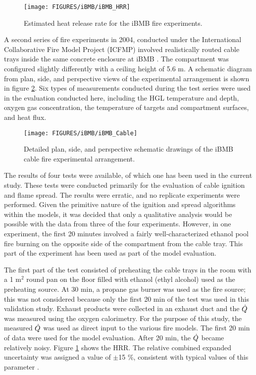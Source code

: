  \begin{figure}
\begin{center}
\texttt{[image: FIGURES/iBMB/iBMB\_HRR]}\\
\end{center}
\caption{Estimated heat release rate for the iBMB fire experiments.}
 \label{fig:iBMB_HRR}
\end{figure}

A second series of fire experiments in 2004, conducted under the International Collaborative Fire Model Project (ICFMP) involved realistically routed cable
trays inside the same concrete enclosure at iBMB \cite{Riese:2004}. The compartment was configured slightly differently with a ceiling height of 5.6 m. A schematic diagram from plan, side, and perspective views of the experimental arrangement is shown in figure \ref{fig:iBMB_Cable_Detailed}. Six types of measurements conducted during the test series were used in the evaluation conducted here, including the HGL temperature and depth, oxygen gas concentration, the temperature of targets and compartment surfaces, and heat flux.

\begin{figure}
\begin{center}
\texttt{[image: FIGURES/iBMB/iBMB\_Cable]}\\
\end{center}
\caption{Detailed plan, side, and perspective schematic drawings of the iBMB cable fire experimental arrangement.}
 \label{fig:iBMB_Cable_Detailed}
\end{figure}

The results of four tests were
available, of which one has been used in the current study.
These tests were conducted primarily for the evaluation of cable ignition and flame spread.
The results were erratic, and no replicate experiments were performed. Given the primitive
nature of the ignition and spread algorithms within the models, it was decided that only
a qualitative analysis would be possible with the data from three of the four experiments.
However, in one experiment, the first 20 minutes involved a fairly well-characterized ethanol
pool fire burning on the opposite side of the compartment from the cable tray. This part of
the experiment has been used as part of the model evaluation.

The first part of the test consisted of preheating the cable trays in the room with a 1 m$^2$ round pan on the floor filled with ethanol (ethyl alcohol) used as the preheating source.  At 30 min, a propane gas burner was used as the fire source; this was not considered because only the first 20 min of the test was used in this validation study.
Exhaust products were collected in an exhaust duct and the $\dot{Q}$  was measured using the oxygen calorimetry.  For the purpose of this study, the measured $\dot{Q}$ was used as direct input to the various fire models.  The first 20 min of data were used for the model evaluation. After 20 min, the  $\dot{Q}$ became relatively noisy.  Figure \ref{fig:iBMB_HRR} shows the HRR. The relative combined expanded uncertainty was assigned a value of $\pm$15 \%, consistent with typical values of this parameter \cite{NRCNUREG1824}.

